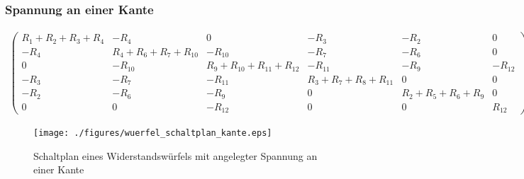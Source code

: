 \documentclass[10pt,a4paper]{article}
\begin{document}
\begin{landscape}
\subsubsection{Spannung an einer Kante}
\begin{align}
\begin{pmatrix}
R_1+R_2+R_3+R_4 &  -R_4  &  0  &  -R_3  &  -R_2  &  0  \\ 
-R_4 & R_4+R_6+R_7+R_{10} & -R_{10} & -R_7 & -R_6 & 0 \\ 
 0  & -R_{10} & R_9+R_{10}+R_{11}+R_{12} & -R_{11} & -R_9 & -R_{12} \\ 
-R_3 & -R_7 & -R_11 & R_3+R_7+R_8+R_{11} & 0 & 0 \\ 
-R_2 & -R_6 & -R_9 & 0 & R_2+R_5+R_6+R_9 & 0 \\ 
 0  & 0 & -R_{12} &  0  & 0 & R_{12}
\end{pmatrix}
\begin{pmatrix}
I_1\\I_2\\I_3\\I_4\\I_5\\I_{ges}
\end{pmatrix}
=
\begin{pmatrix}
0\\0\\0\\0\\0\\U
\end{pmatrix}
\label{eqn:querfel_kante}
\end{align}
\thispagestyle{empty}
\begin{figure}[htbp!]
\centering
\texttt{[image: ./figures/wuerfel\_schaltplan\_kante.eps]}
\caption{Schaltplan eines Widerstandswürfels mit angelegter Spannung an einer Kante}
\label{fig:wuerfel_schaltplan_kante}
\end{figure}

\end{landscape}
\end{document}

